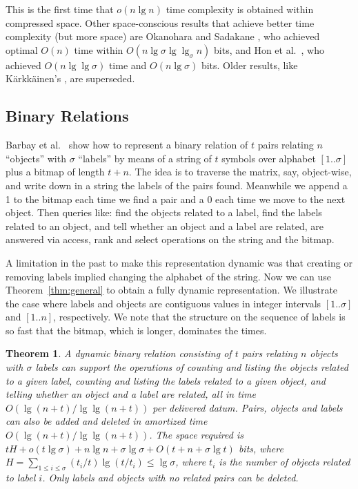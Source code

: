 \documentclass[11pt]{article}
\newtheorem{theorem}{Theorem}
\begin{document}
This is the first time that $o(n\lg n)$ time
complexity is obtained within compressed space. Other
space-conscious results that achieve better time complexity (but more space)
are Okanohara and Sadakane \cite{OS09}, who achieved optimal 
$O(n)$ time within $O(n \lg \sigma \lg\lg_\sigma n)$ bits, and
Hon et al.\ \cite{HSS09}, who achieved $O(n\lg\lg\sigma)$ time and 
$O(n\lg\sigma)$ bits. Older results, like K\"arkk\"ainen's \cite{Kar07}, 
are superseded.

\subsection{Binary Relations}

Barbay et al.\ \cite{BGMR07} show how to represent a binary relation of $t$ pairs
relating $n$ ``objects'' with $\sigma$ ``labels'' by means of a string of
$t$ symbols over alphabet $[1..\sigma]$ plus a bitmap of length $t+n$. The
idea is to traverse the matrix, say, object-wise,
and write down in a string the labels of the pairs found. Meanwhile we append
a 1 to the bitmap each time we find a pair and a 0 each time we move to the
next object. Then queries like: find the objects related to a label, find the
labels related to an object, and tell whether an object and a label are
related, are answered via access, rank and select operations on the string
and the bitmap.

A limitation in the past to make this representation dynamic was that creating
or removing labels implied changing the alphabet of the string. Now we can use
Theorem~\ref{thm:general} to obtain a fully dynamic representation. We 
illustrate the case where labels and objects are contiguous values in integer 
intervals $[1..\sigma]$ and $[1..n]$, respectively. We note that the structure
on the sequence of labels is so fast that the bitmap, which is longer, dominates
the times.

\begin{theorem} \label{thm:binrel}
A dynamic binary relation consisting of $t$ pairs relating $n$ objects 
with $\sigma$ labels can support the operations of 
counting and listing the objects 
related to a given label, counting and listing the labels related to a given 
object, and telling whether an object and a label are related, all in time 
$O(\lg (n+t)/\lg\lg (n+t))$ per delivered datum. Pairs, objects 
and labels can also be added and deleted in amortized time 
$O(\lg (n+t) / \lg\lg (n+t))$. The space required is 
$tH + o(t\lg\sigma)+n\lg n+\sigma\lg \sigma+ O(t+n+\sigma\lg t)$ bits,
where $H=\sum_{1 \le i \le \sigma} (t_i/t)\lg(t/t_i)
\le \lg\sigma$, where $t_i$ is the number of objects related to label $i$.
Only labels and objects with no related pairs can be deleted.
\end{theorem}
\end{document}
